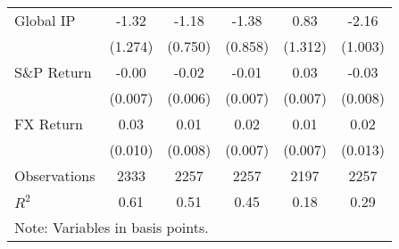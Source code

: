 \begin{table}[htbp]
\begin{tabular*}{0.8\hsize}{@{\hskip\tabcolsep\extracolsep\fill}l*{5}{c}}
\addlinespace
Global IP           &       -1.32         &       -1.18         &       -1.38         &        0.83         &       -2.16\sym{*}  \\
                    &     (1.274)         &     (0.750)         &     (0.858)         &     (1.312)         &     (1.003)         \\
\addlinespace
S\&P Return         &       -0.00         &       -0.02\sym{**} &       -0.01         &        0.03\sym{**} &       -0.03\sym{**} \\
                    &     (0.007)         &     (0.006)         &     (0.007)         &     (0.007)         &     (0.008)         \\
\addlinespace
FX Return           &        0.03\sym{**} &        0.01         &        0.02\sym{*}  &        0.01         &        0.02         \\
                    &     (0.010)         &     (0.008)         &     (0.007)         &     (0.007)         &     (0.013)         \\
\midrule
Observations        &        2333         &        2257         &        2257         &        2197         &        2257         \\
\(R^{2}\)           &        0.61         &        0.51         &        0.45         &        0.18         &        0.29         \\
\bottomrule
\multicolumn{6}{l}{\footnotesize Note: Variables in basis points.}\\
\end{tabular*}
\end{table}
